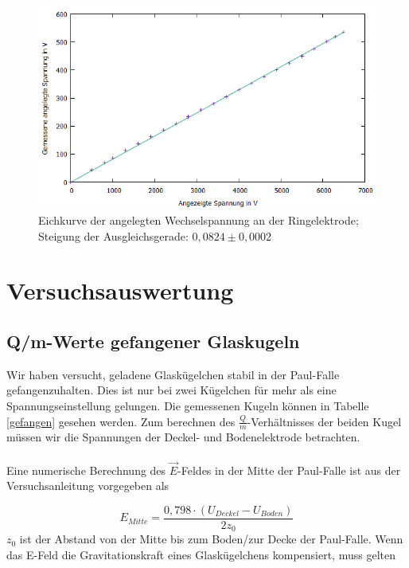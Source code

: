 \documentclass[10pt,a4paper]{article}
\begin{document}
\begin{figure}[h]
	\includegraphics[scale = 0.7]{eichkurve.png}
	\centering
	\caption{Eichkurve der angelegten Wechselspannung an der Ringelektrode; Steigung der Ausgleichsgerade: $0,0824 \pm 0,0002$}
	\label{eichkurve1}
\end{figure}

\section{Versuchsauswertung}

\subsection{Q/m-Werte gefangener Glaskugeln}

Wir haben versucht, geladene Glaskügelchen stabil in der Paul-Falle gefangenzuhalten. Dies ist nur bei zwei Kügelchen für mehr als eine Spannungseinstellung gelungen. Die gemessenen Kugeln können in Tabelle \ref{gefangen} gesehen werden. Zum berechnen des $\frac{Q}{m}$-Verhältnisses der beiden Kugel müssen wir die Spannungen der Deckel- und Bodenelektrode betrachten.\\\\Eine numerische Berechnung des $\vec{E}$-Feldes in der Mitte der Paul-Falle ist aus der Versuchsanleitung vorgegeben als 

\begin{equation}
	E_{Mitte} = \frac{0,798 \cdot (U_{Deckel} - U_{Boden})}{2 z_0}
	\label{emitte1}
\end{equation}
$z_0$ ist der Abstand von der Mitte bis zum Boden/zur Decke der Paul-Falle. Wenn das E-Feld die Gravitationskraft eines Glaskügelchens kompensiert, muss gelten
\end{document}
